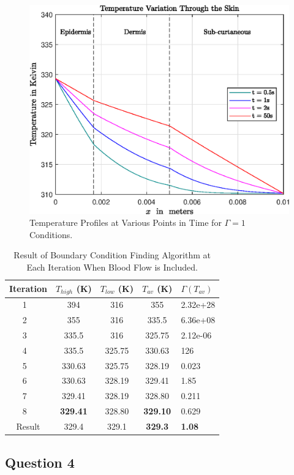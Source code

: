 \documentclass[11pt]{article}
\newcommand{\ra}[1]{\renewcommand{\arraystretch}{#1}}
\begin{document}
\begin{figure}[!h]  %
	\centering
	\includegraphics[width=.75\textwidth]{epsQ3Profiles2}
    \caption{Temperature Profiles at Various Points in Time for $\Gamma = 1$ Conditions. }\label{fig:q3profs2}
\end{figure}
\FloatBarrier

\begin{table}[!h]
\centering %
\ra{1.3}
\begin{tabular}{@{}ccccl@{}}\toprule
 Iteration  & $T_{high}$ (K) & $T_{low}$ (K) &  $T_{av}$ (K) & $\Gamma (T_{av}) $ \\
\midrule
1 \   & 394 & 316  &  355  &  2.32e+28\\
2 \   & 355 & 316  &  335.5  & 6.36e+08 \\
3 \   & 335.5 & 316  &  325.75  &  2.12e-06 \\
4 \   & 335.5 & 325.75  & 330.63  & 126 \\
5 \   & 330.63 & 325.75  &  328.19  &   0.023 \\
6 \   & 330.63 & 328.19  & 329.41  &  1.85\\
7 \   & 329.41 & 328.19  &  328.80  & 0.211  \\
8 \   & \textbf{329.41} &  328.80  &  \textbf{329.10}  &  0.629  \\
\midrule
Result &329.4 & 329.1 & \textbf{329.3} & \textbf{1.08}\\
\bottomrule
\end{tabular}
\caption{Result of Boundary Condition Finding Algorithm at Each Iteration When Blood Flow is Included.}
\label{table:q3bc}
\end{table}

\clearpage


\FloatBarrier
\subsection{Question 4}
\end{document}
